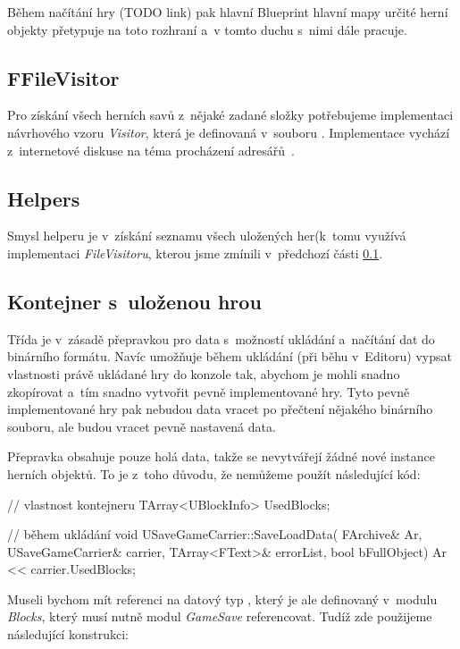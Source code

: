 Během načítání hry (TODO link) pak hlavní Blueprint hlavní mapy určité herní objekty přetypuje na toto rozhraní a~v tomto duchu s~nimi dále pracuje.

\subsection{FFileVisitor}
\label{subsec:ffv}
Pro získání všech herních savů z~nějaké zadané složky potřebujeme implementaci návrhového vzoru \textit{Visitor}, která je definovaná v~souboru . Implementace vychází z~internetové diskuse na téma procházení adresářů~\citep{ue_iterate_dir}.

\subsection{Helpers}
Smysl helperu  je v~získání seznamu všech uložených her\linebreak (k~tomu využívá implementaci \textit{FileVisitoru}, kterou jsme zmínili v~předchozí části \ref{subsec:ffv}.

\subsection{Kontejner s~uloženou hrou}
\label{subsec:uloz}
Třída  je v~zásadě přepravkou pro data s~možností ukládání a~načítání dat do binárního formátu. Navíc umožňuje během ukládání (při běhu v~Editoru) vypsat vlastnosti právě ukládané hry do konzole tak, abychom je mohli snadno zkopírovat a~tím snadno vytvořit pevně implementované hry. Tyto pevně implementované hry pak nebudou data vracet po přečtení nějakého binárního souboru, ale budou vracet pevně nastavená data. 

Přepravka obsahuje pouze holá data, takže se nevytvářejí žádné nové instance herních objektů. To je z~toho důvodu, že nemůžeme použít následující kód:

\begin{code}

// vlastnost kontejneru
TArray<UBlockInfo> UsedBlocks;

// během ukládání
void USaveGameCarrier::SaveLoadData(
	FArchive& Ar,
	USaveGameCarrier& carrier,
	TArray<FText>& errorList,
	bool bFullObject)
{
	Ar << carrier.UsedBlocks;
}
\end{code}
Museli bychom mít referenci na datový typ , který je ale definovaný v~modulu \textit{Blocks}, který musí nutně modul \textit{GameSave} referencovat. Tudíž zde použijeme následující konstrukci:

